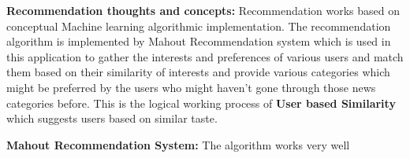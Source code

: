 \textbf{ Recommendation thoughts and concepts: }
 Recommendation works based on conceptual Machine learning algorithmic implementation. The recommendation algorithm is implemented by Mahout Recommendation system which is used in this application to gather the interests and preferences of various users and match them based on their similarity of interests and provide various categories which might be preferred by the users who might haven't gone through those news categories before. This is the logical working process of \textbf{User based Similarity} which suggests users based on similar taste.
 
\textbf{ Mahout Recommendation System: } 
The algorithm works very well 